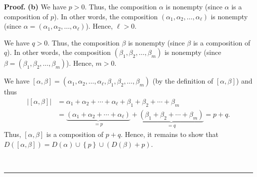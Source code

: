 \documentclass[numbers=enddot,12pt,final,onecolumn,notitlepage,abstracton]{scrartcl}%
\theoremstyle{definition}
\newenvironment{proof}[1][Proof]{\noindent\textbf{#1.} }{\ \rule{0.5em}{0.5em}}
\newenvironment{verlong}{}{}
\begin{document}
\begin{verlong}
\begin{proof}
\textbf{(b)} We have $p > 0$. Thus, the composition $\alpha$ is nonempty
(since $\alpha$ is a composition of $p$). In other words, the composition
$\left(  \alpha_{1}, \alpha_{2}, \ldots, \alpha_{\ell}\right)  $ is nonempty
(since $\alpha= \left(  \alpha_{1}, \alpha_{2}, \ldots, \alpha_{\ell}\right)
$). Hence, $\ell> 0$.

We have $q > 0$. Thus, the composition $\beta$ is nonempty (since $\beta$ is a
composition of $q$). In other words, the composition $\left(  \beta_{1},
\beta_{2}, \ldots, \beta_{m}\right)  $ is nonempty (since $\beta= \left(
\beta_{1}, \beta_{2}, \ldots, \beta_{m}\right)  $). Hence, $m > 0$.

We have $\left[  \alpha,\beta\right]  =\left(  \alpha_{1},\alpha_{2}%
,\ldots,\alpha_{\ell},\beta_{1},\beta_{2},\ldots,\beta_{m}\right)  $ (by the
definition of $\left[  \alpha,\beta\right]  $) and thus%
\begin{align*}
\left\vert \left[  \alpha,\beta\right]  \right\vert  &  =\alpha_{1}+\alpha
_{2}+\cdots+\alpha_{\ell}+\beta_{1}+\beta_{2}+\cdots+\beta_{m}\\
&  =\underbrace{\left(  \alpha_{1}+\alpha_{2}+\cdots+\alpha_{\ell}\right)
}_{=p}+\underbrace{\left(  \beta_{1}+\beta_{2}+\cdots+\beta_{m}\right)  }%
_{=q}=p+q.
\end{align*}
Thus, $\left[  \alpha,\beta\right]  $ is a composition of $p+q$. Hence, it
remains to show that $D\left(  \left[  \alpha,\beta\right]  \right)  =D\left(
\alpha\right)  \cup\left\{  p\right\}  \cup\left(  D\left(  \beta\right)
+p\right)  $.


\end{proof}
\end{verlong}
\end{document}
